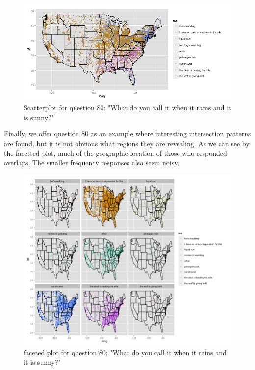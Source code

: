 \documentclass{article}\usepackage[]{graphicx}\usepackage[]{color}
\begin{document}
\begin{figure}[H]
\centering
\includegraphics[width=450pts, height=200pts]{sunshower.png}
\caption{Scatterplot for question 80: "What do you call it when it rains and it is sunny?"}

\end{figure}

Finally, we offer question 80 as an example where interesting intersection patterns are found, but it is not obvious what regions they are revealing.  As we can see by the facetted plot, much of the geographic location of those who responded overlaps.  The smaller frequency responses also seem noisy. 


\begin{figure}[H]
\centering
\includegraphics[width=550pts, height=300pts]{sunshower_facet.png}
\caption{faceted plot for question 80: "What do you call it when it rains and it is sunny?"}

\end{figure}
\end{document}
